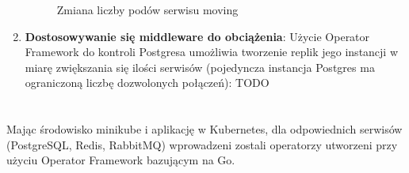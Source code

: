 \documentclass[polish]{aghengthesis}
\begin{document}
\begin{enumerate}
\begin{figure}[!htbp]
    \caption{Zmiana liczby podów serwisu moving}
    \label{fig:scaling}
\end{figure} 
    \item \textbf{Dostosowywanie się middleware do obciążenia}:
     Użycie Operator Framework do kontroli Postgresa umożliwia tworzenie replik jego instancji w miarę zwiększania się ilości serwisów (pojedyncza instancja Postgres ma ograniczoną liczbę dozwolonych połączeń):
    TODO
\end{enumerate}

\chapter{\ChapterTitleDemoDeployment}
\label{sec:deployment}
Mając środowisko minikube i aplikację w Kubernetes, dla odpowiednich serwisów (PostgreSQL, Redis, RabbitMQ) wprowadzeni zostali operatorzy utworzeni przy użyciu Operator Framework bazującym na Go.
\end{document}
